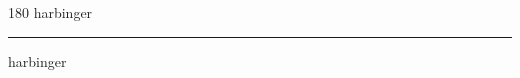 
\begin{frame}
\begin{center}
\begin{turn}{180}
{\fontsize{2.5cm}{1em}\selectfont harbinger}
\end{turn}
\vspace{1em}\par  
\hrule
\vspace{1em}\par  
{\fontsize{2.5cm}{1em}\selectfont harbinger}
\end{center}
\end{frame}

